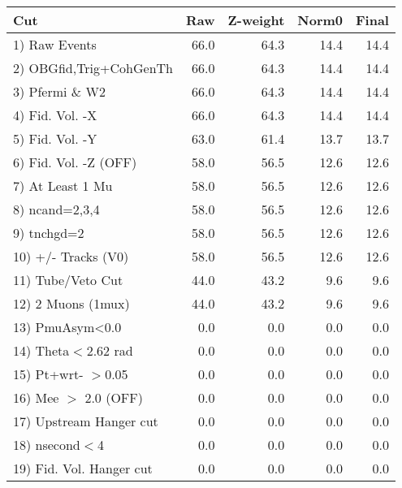  \begin{table}[h!]\centering
 \begin{tabular}{||l||r|r|r|r||}
 \hline
 \hline
 Cut & Raw & Z-weight & Norm0 & Final \\
 \hline
  1) Raw Events           &        66.0 &        64.3 &        14.4 &        14.4 \\
  2) OBGfid,Trig+CohGenTh &        66.0 &        64.3 &        14.4 &        14.4 \\
  3) Pfermi \& W2         &        66.0 &        64.3 &        14.4 &        14.4 \\
  4) Fid. Vol. -X         &        66.0 &        64.3 &        14.4 &        14.4 \\
  5) Fid. Vol. -Y         &        63.0 &        61.4 &        13.7 &        13.7 \\
  6) Fid. Vol. -Z (OFF)   &        58.0 &        56.5 &        12.6 &        12.6 \\
  7) At Least 1 Mu        &        58.0 &        56.5 &        12.6 &        12.6 \\
  8) ncand=2,3,4          &        58.0 &        56.5 &        12.6 &        12.6 \\
  9) tnchgd=2             &        58.0 &        56.5 &        12.6 &        12.6 \\
 10) +/- Tracks (V0)      &        58.0 &        56.5 &        12.6 &        12.6 \\
 11) Tube/Veto Cut        &        44.0 &        43.2 &         9.6 &         9.6 \\
 12) 2 Muons (1mux)       &        44.0 &        43.2 &         9.6 &         9.6 \\
 13) PmuAsym<0.0          &         0.0 &         0.0 &         0.0 &         0.0 \\
 14) Theta$<$2.62 rad     &         0.0 &         0.0 &         0.0 &         0.0 \\
 15) Pt+wrt- $>$0.05      &         0.0 &         0.0 &         0.0 &         0.0 \\
 16) Mee $>$ 2.0  (OFF)   &         0.0 &         0.0 &         0.0 &         0.0 \\
 17) Upstream Hanger cut  &         0.0 &         0.0 &         0.0 &         0.0 \\
 18) nsecond$<$4          &         0.0 &         0.0 &         0.0 &         0.0 \\
 19) Fid. Vol. Hanger cut &         0.0 &         0.0 &         0.0 &         0.0 \\

\end{tabular}
\end{table}
